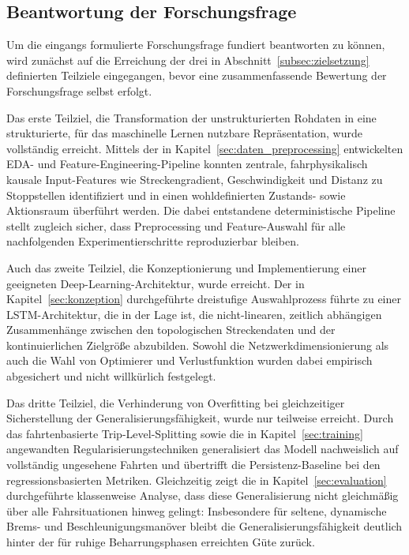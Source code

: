\subsection{Beantwortung der Forschungsfrage}
\label{subsec:forschungsfrage}

Um die eingangs formulierte Forschungsfrage fundiert beantworten zu können, wird zunächst auf die Erreichung der drei in Abschnitt~\ref{subsec:zielsetzung} definierten Teilziele eingegangen, bevor eine zusammenfassende Bewertung der Forschungsfrage selbst erfolgt.

Das erste Teilziel, die Transformation der unstrukturierten Rohdaten in eine strukturierte, für das maschinelle Lernen nutzbare Repräsentation, wurde vollständig erreicht. Mittels der in Kapitel~\ref{sec:daten_preprocessing} entwickelten EDA- und Feature-Engineering-Pipeline konnten zentrale, fahrphysikalisch kausale Input-Features wie Streckengradient, Geschwindigkeit und Distanz zu Stoppstellen identifiziert und in einen wohldefinierten Zustands- sowie Aktionsraum überführt werden. Die dabei entstandene deterministische Pipeline stellt zugleich sicher, dass Preprocessing und Feature-Auswahl für alle nachfolgenden Experimentierschritte reproduzierbar bleiben.

Auch das zweite Teilziel, die Konzeptionierung und Implementierung einer geeigneten Deep-Learning-Architektur, wurde erreicht. Der in Kapitel~\ref{sec:konzeption} durchgeführte dreistufige Auswahlprozess führte zu einer LSTM-Architektur, die in der Lage ist, die nicht-linearen, zeitlich abhängigen Zusammenhänge zwischen den topologischen Streckendaten und der kontinuierlichen Zielgröße abzubilden. Sowohl die Netzwerkdimensionierung als auch die Wahl von Optimierer und Verlustfunktion wurden dabei empirisch abgesichert und nicht willkürlich festgelegt.

Das dritte Teilziel, die Verhinderung von Overfitting bei gleichzeitiger Sicherstellung der Generalisierungsfähigkeit, wurde nur teilweise erreicht. Durch das fahrtenbasierte Trip-Level-Splitting sowie die in Kapitel~\ref{sec:training} angewandten Regularisierungstechniken generalisiert das Modell nachweislich auf vollständig ungesehene Fahrten und übertrifft die Persistenz-Baseline bei den regressionsbasierten Metriken. Gleichzeitig zeigt die in Kapitel~\ref{sec:evaluation} durchgeführte klassenweise Analyse, dass diese Generalisierung nicht gleichmäßig über alle Fahrsituationen hinweg gelingt: Insbesondere für seltene, dynamische Brems- und Beschleunigungsmanöver bleibt die Generalisierungsfähigkeit deutlich hinter der für ruhige Beharrungsphasen erreichten Güte zurück.

